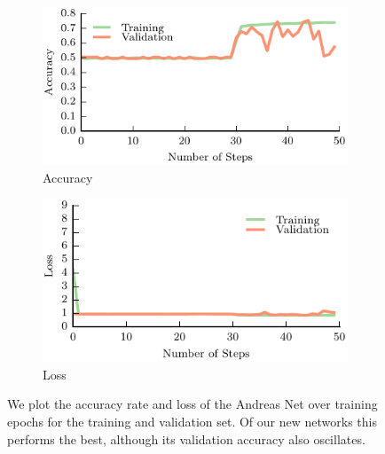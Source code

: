 \begin{figure}[t!]
    \centering
    \begin{subfigure}[t]{0.49\textwidth}
        \includegraphics[width=0.9\columnwidth]{figs/andreas_accuracy.pdf}
        \caption{Accuracy} \label{fig:accuracy}
        \end{subfigure}
    \begin{subfigure}[t]{0.49\textwidth}
        \includegraphics[width=0.9\columnwidth]{figs/andreas_loss.pdf}
        \caption{Loss} \label{fig:loss}
    \end{subfigure}
\caption{We plot the accuracy rate and loss of the Andreas Net over training epochs for the training and validation set. Of our new networks this performs the best, although its validation accuracy also oscillates.} \label{fig:andreas_results}
\end{figure}